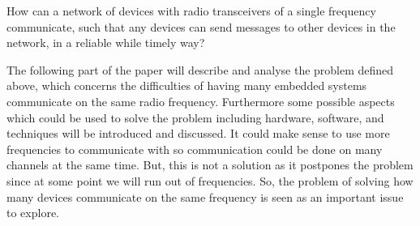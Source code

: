 \medskip
{\addtolength{\leftskip}{10mm}\addtolength{\rightskip}{10mm}\noindent\hrulefill\it

\noindent How can a network of devices with radio transceivers of a single frequency communicate, such that any devices can send messages to other devices in the network, in a reliable while timely way?

\noindent\hrulefill

}

\bigskip \noindent
The following part of the paper will describe and analyse the problem defined above, which concerns the difficulties of having many embedded systems communicate on the same radio frequency.
Furthermore some possible aspects which could be used to solve the problem including hardware, software, and techniques will be introduced and discussed.
It could make sense to use more frequencies to communicate with so communication could be done on many channels at the same time.
But, this is not a solution as it postpones the problem since at some point we will run out of frequencies. 
So, the problem of solving how many devices communicate on the same frequency is seen as an important issue to explore.